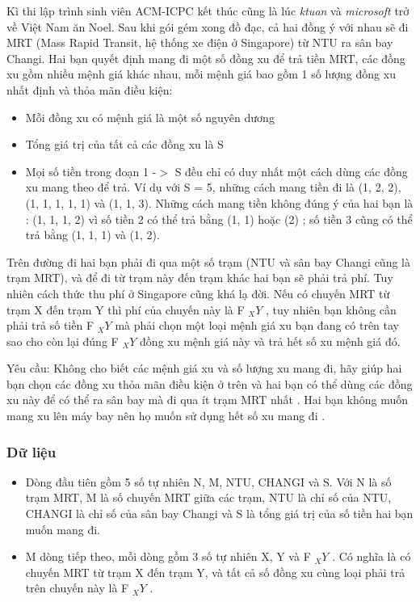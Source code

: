 



   Kì thi lập trình sinh viên ACM-ICPC kết thúc cũng là lúc   \textit{    ktuan   }   và   \textit{    microsoft   }   trở về Việt Nam ăn Noel. Sau khi gói gém xong đồ đạc, cả hai đồng ý với nhau sẽ đi MRT (Mass Rapid Transit, hệ thống xe điện ở Singapore) từ NTU ra sân bay Changi. Hai bạn quyết định mang đi một số đồng xu để trả tiền MRT, các đồng xu gồm nhiều mệnh giá khác nhau, mỗi mệnh giá bao gồm 1 số lượng đồng xu nhất định và thỏa mãn điều kiện:  
\begin{itemize}
	\item     Mỗi đồng xu có mệnh giá là một số nguyên dương   
	\item     Tổng giá trị của tất cả các đồng xu là S   
	\item     Mọi số tiền trong đoạn 1 -$>$ S đều chỉ có duy nhất một cách dùng các đồng xu mang theo để trả. Ví dụ với S = 5, những cách mang tiền đi là (1, 2, 2), (1, 1, 1, 1, 1) và (1, 1, 3). Những cách mang tiền không đúng ý của hai bạn là : (1, 1, 1, 2) vì số tiền 2 có thể trả bằng (1, 1) hoặc (2) ; số tiền 3 cũng có thể trả bằng (1, 1, 1) và (1, 2).   
\end{itemize}

   Trên đường đi hai bạn phải đi qua một số trạm (NTU và sân bay Changi cũng là trạm MRT), và để đi từ trạm này đến trạm khác hai bạn sẽ phải trả phí. Tuy nhiên cách thức thu phí ở Singapore cũng khá lạ đời. Nếu có chuyến MRT từ trạm X đến trạm Y thì phí của chuyến này là F   $_    XY   $   , tuy nhiên bạn không cần phải trả số tiền F   $_    XY   $   mà       phải chọn một loại mệnh giá xu         bạn đang có        trên tay sao cho còn lại đúng F    $_     XY    $    đồng xu mệnh giá này và trả hết số xu mệnh giá đó.     

       Yêu cầu:      Không cho biết các mệnh giá xu và số lượng xu mang đi, hãy giúp hai bạn chọn các đồng xu       thỏa mãn điều kiện ở trên      và hai bạn có thể dùng các đồng xu này để       có thể ra sân bay      mà       đi qua ít trạm MRT nhất      . Hai bạn không muốn mang xu lên máy bay nên họ muốn       sử dụng hết số xu mang đi      .  

\subsubsection{   Dữ liệu  }
\begin{itemize}
	\item     Dòng đầu tiên gồm 5 số tự nhiên N, M, NTU, CHANGI và S. Với N là số trạm MRT, M là số chuyến MRT giữa các trạm, NTU là chỉ số của NTU, CHANGI là chỉ số của sân bay Changi và S là tổng giá trị của số tiền hai bạn muốn mang đi.   
	\item     M dòng tiếp theo, mỗi dòng gồm 3 số tự nhiên X, Y và F    $_     XY    $    . Có nghĩa là có chuyến MRT từ trạm X đến trạm Y, và tất cả số đồng xu cùng loại phải trả trên chuyến này là F    $_     XY    $    .   
\end{itemize}

